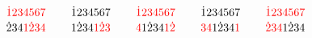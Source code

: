 \[ \SeqCompare{\textcolor{red}{\dot{1}}\textcolor{red}{2}\textcolor{red}{3}\textcolor{red}{4}\textcolor{red}{5}\textcolor{red}{6}\textcolor{red}{7}}{\dot{2}34\textcolor{red}{1}\textcolor{red}{\dot{2}}\textcolor{red}{3}\textcolor{red}{4}}
\qquad
\SeqCompare{\dot{1}234567}{1\dot{2}34\textcolor{red}{1}\textcolor{red}{\dot{2}}\textcolor{red}{3}}
\qquad
\SeqCompare{\textcolor{red}{\dot{1}}\textcolor{red}{2}\textcolor{red}{3}\textcolor{red}{4}\textcolor{red}{5}\textcolor{red}{6}\textcolor{red}{7}}{\textcolor{red}{4}1\dot{2}34\textcolor{red}{1}\textcolor{red}{\dot{2}}}
\qquad
\SeqCompare{\dot{1}234567}{\textcolor{red}{3}\textcolor{red}{4}1\dot{2}34\textcolor{red}{1}}
\qquad
\SeqCompare{\textcolor{red}{\dot{1}}\textcolor{red}{2}\textcolor{red}{3}\textcolor{red}{4}\textcolor{red}{5}\textcolor{red}{6}\textcolor{red}{7}}{\textcolor{red}{\dot{2}}\textcolor{red}{3}\textcolor{red}{4}1\dot{2}34} \]